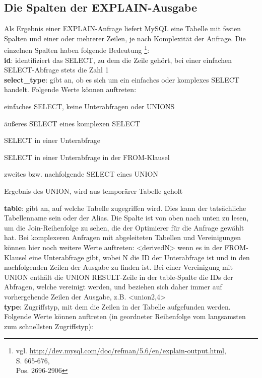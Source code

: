 \subsection{Die Spalten der EXPLAIN-Ausgabe}
Als Ergebnis einer EXPLAIN-Anfrage liefert MySQL eine Tabelle mit festen Spalten und einer oder mehrerer Zeilen, je nach Komplexität der Anfrage. Die einzelnen Spalten haben folgende Bedeutung  \footnote{vgl. \cite{manual} \url{http://dev.mysql.com/doc/refman/5.6/en/explain-output.html},\\ \cite{Schwartz2009} S. 665-676, \\ \cite{Bradford2011} Pos. 2696-2906}:\\
\textbf{id}: identifiziert das SELECT, zu dem die Zeile gehört, bei einer einfachen SELECT-Abfrage stets die Zahl 1\\
\textbf{select\_type}: gibt an, ob es sich um ein einfaches oder komplexes SELECT handelt. Folgende Werte können auftreten:
\begin{description}[labelwidth=90pt,font=\ttfamily]
	\item[SIMPLE] einfaches SELECT, keine Unterabfragen oder UNIONS
	\item[PRIMARY] äußeres SELECT eines komplexen SELECT
	\item[SUBQUERY] SELECT in einer Unterabfrage
	\item[DERIVED] SELECT in einer Unterabfrage in der FROM-Klausel
	\item[UNION] zweites bzw. nachfolgende SELECT eines UNION
	\item[UNION RESULT] Ergebnis des UNION, wird aus temporärer Tabelle geholt
\end{description}
\textbf{table}: gibt an, auf welche Tabelle zugegriffen wird. Dies kann der tatsächliche Tabellenname sein oder der Alias. Die Spalte ist von oben nach unten zu lesen, um die Join-Reihenfolge zu sehen, die der Optimierer für die Anfrage gewählt hat.
Bei komplexeren Anfragen mit abgeleiteten Tabellen und Vereinigungen können hier noch weitere Werte auftreten: <derivedN> wenn es in der FROM-Klausel eine Unterabfrage gibt, wobei N die ID der Unterabfrage ist und in den nachfolgenden Zeilen der Ausgabe zu finden ist. Bei einer Vereinigung mit UNION enthält die UNION RESULT-Zeile in der table-Spalte die IDs der Abfragen, welche vereinigt werden, und beziehen sich daher immer auf vorhergehende Zeilen der Ausgabe, z.B. <union2,4>\\
\textbf{type}: Zugriffstyp, mit dem die Zeilen in der Tabelle aufgefunden werden. Folgende Werte können auftreten (in geordneter Reihenfolge vom langsamsten zum schnellsten Zugriffstyp):
